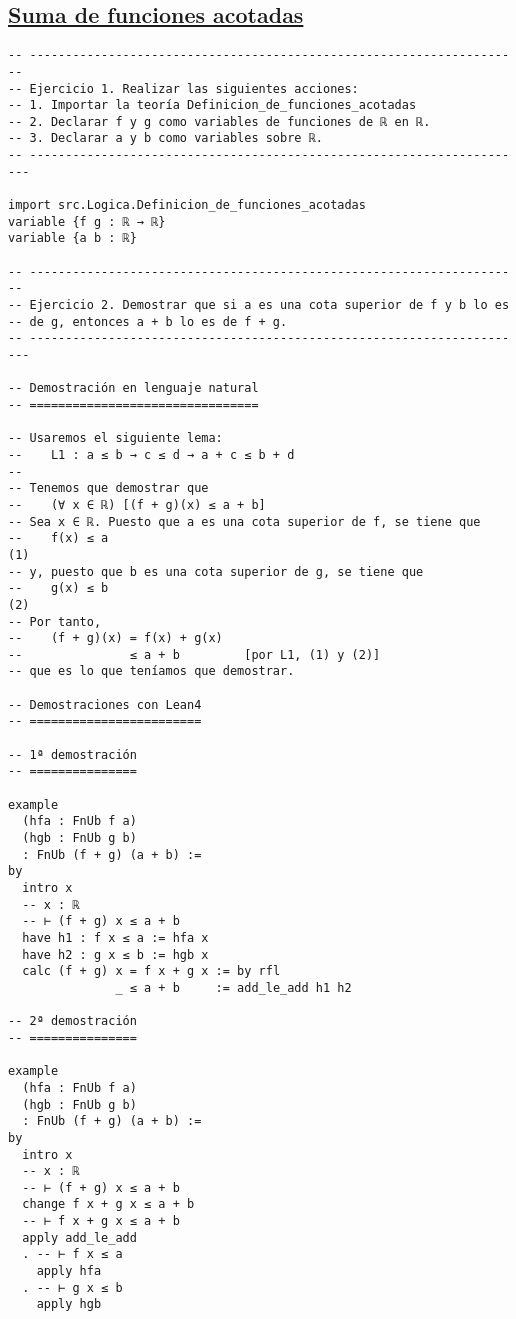 \subsection{\href{./src/Logica/Suma\_de\_funciones\_acotadas.lean}{Suma de funciones acotadas}}
\label{sec:org7f09094}
\begin{verbatim}
-- ---------------------------------------------------------------------
-- Ejercicio 1. Realizar las siguientes acciones:
-- 1. Importar la teoría Definicion_de_funciones_acotadas
-- 2. Declarar f y g como variables de funciones de ℝ en ℝ.
-- 3. Declarar a y b como variables sobre ℝ.
-- ----------------------------------------------------------------------

import src.Logica.Definicion_de_funciones_acotadas
variable {f g : ℝ → ℝ}
variable {a b : ℝ}

-- ---------------------------------------------------------------------
-- Ejercicio 2. Demostrar que si a es una cota superior de f y b lo es
-- de g, entonces a + b lo es de f + g.
-- ----------------------------------------------------------------------

-- Demostración en lenguaje natural
-- ================================

-- Usaremos el siguiente lema:
--    L1 : a ≤ b → c ≤ d → a + c ≤ b + d
--
-- Tenemos que demostrar que
--    (∀ x ∈ ℝ) [(f + g)(x) ≤ a + b]
-- Sea x ∈ ℝ. Puesto que a es una cota superior de f, se tiene que
--    f(x) ≤ a                                                       (1)
-- y, puesto que b es una cota superior de g, se tiene que
--    g(x) ≤ b                                                       (2)
-- Por tanto,
--    (f + g)(x) = f(x) + g(x)
--               ≤ a + b         [por L1, (1) y (2)]
-- que es lo que teníamos que demostrar.

-- Demostraciones con Lean4
-- ========================

-- 1ª demostración
-- ===============

example
  (hfa : FnUb f a)
  (hgb : FnUb g b)
  : FnUb (f + g) (a + b) :=
by
  intro x
  -- x : ℝ
  -- ⊢ (f + g) x ≤ a + b
  have h1 : f x ≤ a := hfa x
  have h2 : g x ≤ b := hgb x
  calc (f + g) x = f x + g x := by rfl
               _ ≤ a + b     := add_le_add h1 h2

-- 2ª demostración
-- ===============

example
  (hfa : FnUb f a)
  (hgb : FnUb g b)
  : FnUb (f + g) (a + b) :=
by
  intro x
  -- x : ℝ
  -- ⊢ (f + g) x ≤ a + b
  change f x + g x ≤ a + b
  -- ⊢ f x + g x ≤ a + b
  apply add_le_add
  . -- ⊢ f x ≤ a
    apply hfa
  . -- ⊢ g x ≤ b
    apply hgb


\end{verbatim}
